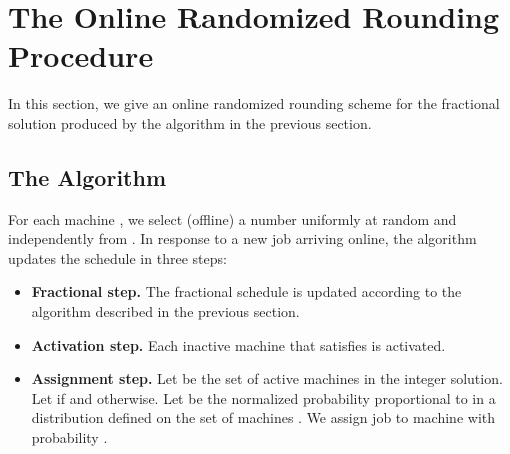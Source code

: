 \documentclass[11pt]{article}
\begin{document}
\section{The Online Randomized Rounding Procedure} 
\label{sec:rounding}

In this section, we give an online randomized rounding scheme for the fractional solution produced by
the algorithm in the previous section. 

\subsection{The Algorithm}
For each machine , we select (offline) a number  uniformly at random and 
independently from . In response to a new job  arriving online, the
algorithm updates the schedule in three steps:
\begin{itemize}
\item {\bf Fractional step.} The fractional schedule is updated according to the algorithm 
described in the previous section.
\item {\bf Activation step.} Each inactive machine  that satisfies 
is activated.
\item {\bf Assignment step.} Let  be the set of active machines in the integer solution. Let 
 if  and  otherwise. 
Let  be the normalized probability proportional to  in a distribution defined on the 
set of machines . We assign job  to machine  with probability .
\end{itemize}
\end{document}
